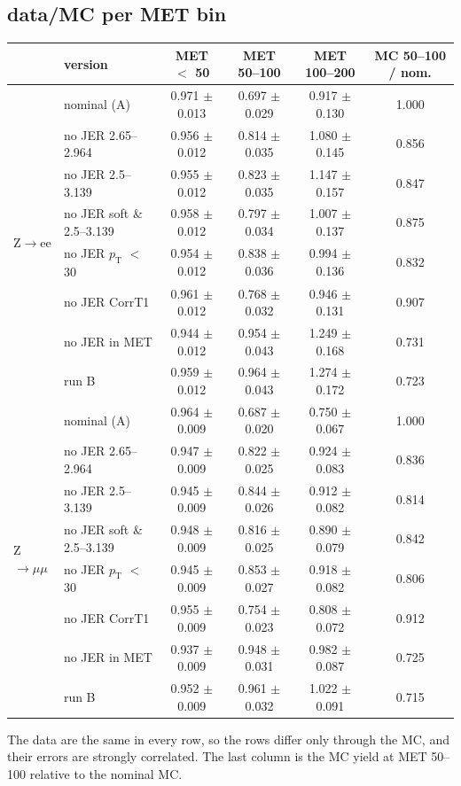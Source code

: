 \documentclass[11pt,a4paper]{article}
\newcommand{\Zee}{Z$\to$ee}
\newcommand{\Zmm}{Z$\to\mu\mu$}
\newcommand{\pt}{$p_\mathrm{T}$}
\begin{document}
\subsection{data/MC per MET bin}
\begin{center}
\footnotesize
\begin{tabular}{l l ccc c}
\toprule
 & version & MET $<$ 50 & MET 50--100 & MET 100--200 & MC 50--100 / nom. \\
\midrule
\multirow{8}{*}{\Zee}
& nominal (A) & 0.971 $\pm$ 0.013 & 0.697 $\pm$ 0.029 & 0.917 $\pm$ 0.130 & 1.000 \\
& no JER 2.65--2.964 & 0.956 $\pm$ 0.012 & 0.814 $\pm$ 0.035 & 1.080 $\pm$ 0.145 & 0.856 \\
& no JER 2.5--3.139 & 0.955 $\pm$ 0.012 & 0.823 $\pm$ 0.035 & 1.147 $\pm$ 0.157 & 0.847 \\
& no JER soft \& 2.5--3.139 & 0.958 $\pm$ 0.012 & 0.797 $\pm$ 0.034 & 1.007 $\pm$ 0.137 & 0.875 \\
& no JER \pt{} $<$ 30 & 0.954 $\pm$ 0.012 & 0.838 $\pm$ 0.036 & 0.994 $\pm$ 0.136 & 0.832 \\
& no JER CorrT1 & 0.961 $\pm$ 0.012 & 0.768 $\pm$ 0.032 & 0.946 $\pm$ 0.131 & 0.907 \\
& no JER in MET & 0.944 $\pm$ 0.012 & 0.954 $\pm$ 0.043 & 1.249 $\pm$ 0.168 & 0.731 \\
& run B & 0.959 $\pm$ 0.012 & 0.964 $\pm$ 0.043 & 1.274 $\pm$ 0.172 & 0.723 \\
\midrule
\multirow{8}{*}{\Zmm}
& nominal (A) & 0.964 $\pm$ 0.009 & 0.687 $\pm$ 0.020 & 0.750 $\pm$ 0.067 & 1.000 \\
& no JER 2.65--2.964 & 0.947 $\pm$ 0.009 & 0.822 $\pm$ 0.025 & 0.924 $\pm$ 0.083 & 0.836 \\
& no JER 2.5--3.139 & 0.945 $\pm$ 0.009 & 0.844 $\pm$ 0.026 & 0.912 $\pm$ 0.082 & 0.814 \\
& no JER soft \& 2.5--3.139 & 0.948 $\pm$ 0.009 & 0.816 $\pm$ 0.025 & 0.890 $\pm$ 0.079 & 0.842 \\
& no JER \pt{} $<$ 30 & 0.945 $\pm$ 0.009 & 0.853 $\pm$ 0.027 & 0.918 $\pm$ 0.082 & 0.806 \\
& no JER CorrT1 & 0.955 $\pm$ 0.009 & 0.754 $\pm$ 0.023 & 0.808 $\pm$ 0.072 & 0.912 \\
& no JER in MET & 0.937 $\pm$ 0.009 & 0.948 $\pm$ 0.031 & 0.982 $\pm$ 0.087 & 0.725 \\
& run B & 0.952 $\pm$ 0.009 & 0.961 $\pm$ 0.032 & 1.022 $\pm$ 0.091 & 0.715 \\
\bottomrule
\end{tabular}
\end{center}
The data are the same in every row, so the rows differ only through the MC, and their errors are strongly correlated.
The last column is the MC yield at MET 50--100 relative to the nominal MC.
\end{document}
